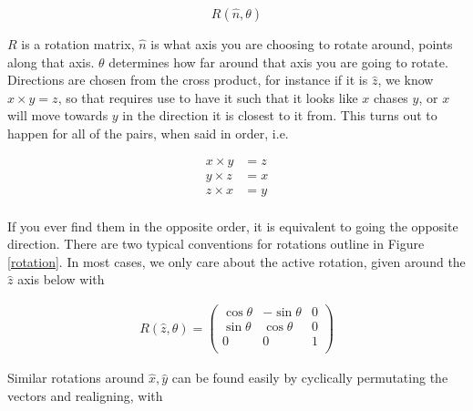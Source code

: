 $$R(\hat{n},\theta)$$

$R$ is a rotation matrix, $\hat{n}$ is what axis you are choosing to rotate around, points along that axis. $\theta$ determines how far around that axis you are going to rotate. Directions are chosen from the cross product, for instance if it is $\hat{z}$, we know $x\times y=z$, so that requires use to have it such that it looks like $x$ chases $y$, or $x$ will move towards $y$ in the direction it is closest to it from. This turns out to happen for all of the pairs, when said in order, i.e.

\begin{align}
x\times y &= z\\
y\times z &= x\\
z\times x &= y\\
\end{align}

If you ever find them in the opposite order, it is equivalent to going the opposite direction. There are two typical conventions for rotations outline in Figure \ref{rotation}. In most cases, we only care about the active rotation, given around the $\hat{z}$ axis below with

\begin{align}
R(\hat{z},\theta) =  \left(
{\begin{array}{ccc}
\cos\theta&-\sin\theta&0\\
\sin\theta&\cos\theta&0\\
0&0&1\\
\end{array}}
\right)
\end{align}

Similar rotations around $\hat{x},\hat{y}$ can be found easily by cyclically permutating the vectors and realigning, with

